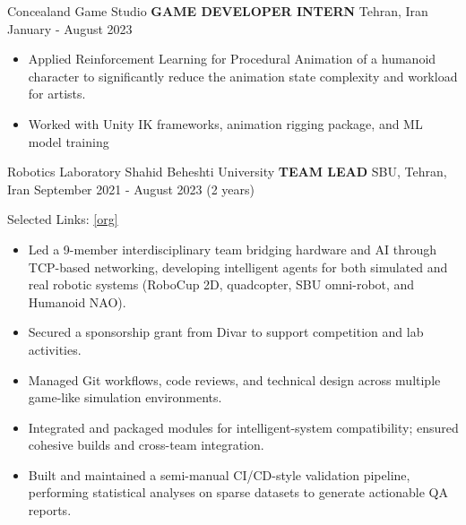 \begin{cventries}
    \cventry
    {Concealand Game Studio}
    {\textbf{GAME DEVELOPER INTERN}}
    {Tehran, Iran}
    {January - August 2023}
    {
        \begin{itemize}    
            \item Applied Reinforcement Learning for Procedural Animation of a humanoid character to significantly reduce the animation state complexity and workload for artists.
            \item Worked with Unity IK frameworks, animation rigging package, and ML model training
        \end{itemize}
    }
\end{cventries}

\begin{cventries}
    \cventry
    {Robotics Laboratory \textemdash Shahid Beheshti University}
    {\textbf{TEAM LEAD}}
    {SBU, Tehran, Iran}
    {September 2021 - August 2023 (2 years)}
    {
        Selected Links: \hspace{0.1 cm} \href{https://github.com/cserobotic}{\textcolor{cobalt}{[org]}}
        \begin{itemize}
            \item Led a 9-member interdisciplinary team bridging hardware and AI through TCP-based networking, developing intelligent agents for both simulated and real robotic systems (RoboCup 2D, quadcopter, SBU omni-robot, and Humanoid NAO).
            \item Secured a sponsorship grant from Divar to support competition and lab activities.
            \item Managed Git workflows, code reviews, and technical design across multiple game-like simulation environments.
            \item Integrated and packaged modules for intelligent-system compatibility; ensured cohesive builds and cross-team integration.
            \item Built and maintained a semi-manual CI/CD-style validation pipeline, performing statistical analyses on sparse datasets to generate actionable QA reports.
        \end{itemize}
    }
\end{cventries}

